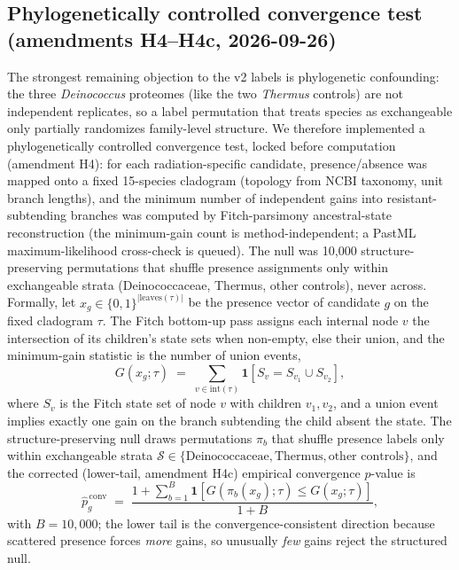 \documentclass[12pt,a4paper]{article}
\begin{document}
\subsection{Phylogenetically controlled convergence test (amendments H4--H4c, 2026-09-26)}
The strongest remaining objection to the v2 labels is phylogenetic confounding: the three \emph{Deinococcus} proteomes (like the two \emph{Thermus} controls) are not independent replicates, so a label permutation that treats species as exchangeable only partially randomizes family-level structure. We therefore implemented a phylogenetically controlled convergence test, locked before computation (amendment H4): for each radiation-specific candidate, presence/absence was mapped onto a fixed 15-species cladogram (topology from NCBI taxonomy, unit branch lengths), and the minimum number of independent gains into resistant-subtending branches was computed by Fitch-parsimony ancestral-state reconstruction (the minimum-gain count is method-independent; a PastML maximum-likelihood cross-check is queued). The null was 10{,}000 structure-preserving permutations that shuffle presence assignments only within exchangeable strata (Deinococcaceae, Thermus, other controls), never across.
Formally, let $x_g \in \{0,1\}^{|\mathrm{leaves}(\tau)|}$ be the presence vector of candidate $g$ on the fixed cladogram $\tau$. The Fitch bottom-up pass assigns each internal node $v$ the intersection of its children's state sets when non-empty, else their union, and the minimum-gain statistic is the number of union events,
\begin{equation}
G(x_g;\tau) \;=\; \sum_{v \in \mathrm{int}(\tau)} \mathbf{1}\!\left[ S_v = S_{v_1} \cup S_{v_2} \right],
\end{equation}
where $S_v$ is the Fitch state set of node $v$ with children $v_1, v_2$, and a union event implies exactly one gain on the branch subtending the child absent the state. The structure-preserving null draws permutations $\pi_b$ that shuffle presence labels only within exchangeable strata $\mathcal{S} \in \{\text{Deinococcaceae}, \text{Thermus}, \text{other controls}\}$, and the corrected (lower-tail, amendment H4c) empirical convergence $p$-value is
\begin{equation}
\hat{p}^{\,\mathrm{conv}}_g \;=\; \frac{1 + \sum_{b=1}^{B} \mathbf{1}\!\left[ G(\pi_b(x_g);\tau) \le G(x_g;\tau) \right]}{1 + B},
\end{equation}
with $B = 10{,}000$; the lower tail is the convergence-consistent direction because scattered presence forces \emph{more} gains, so unusually \emph{few} gains reject the structured null.
\end{document}
